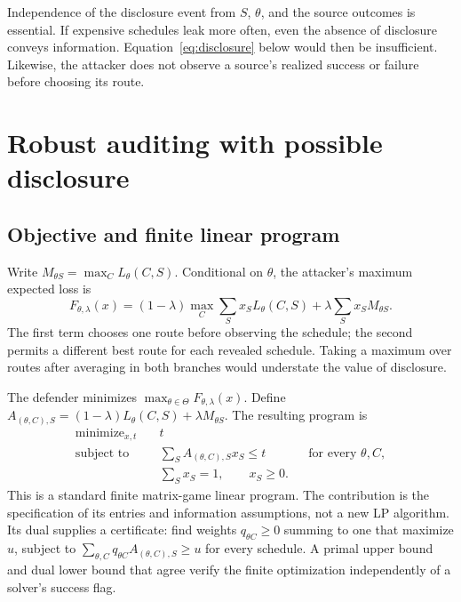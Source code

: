 \documentclass[11pt,letterpaper]{article}
\begin{document}
Independence of the disclosure event from $S$, $\theta$, and the source outcomes is essential. If expensive schedules leak more often, even the absence of disclosure conveys information. Equation~\ref{eq:disclosure} below would then be insufficient. Likewise, the attacker does not observe a source's realized success or failure before choosing its route.

\section{Robust auditing with possible disclosure}

\subsection{Objective and finite linear program}

Write $M_{\theta S}=\max_C L_\theta(C,S)$. Conditional on $\theta$, the attacker's maximum expected loss is
\begin{equation}
F_{\theta,\lambda}(x)=(1-\lambda)\max_C\sum_Sx_SL_\theta(C,S)
+\lambda\sum_Sx_SM_{\theta S}.
\label{eq:disclosure}
\end{equation}
The first term chooses one route before observing the schedule; the second permits a different best route for each revealed schedule. Taking a maximum over routes after averaging in both branches would understate the value of disclosure.

The defender minimizes $\max_{\theta\in\Theta}F_{\theta,\lambda}(x)$. Define
$A_{(\theta,C),S}=(1-\lambda)L_\theta(C,S)+\lambda M_{\theta S}$.
The resulting program is
\begin{equation}
\begin{aligned}
\text{minimize}_{x,t}\quad &t\\
\text{subject to}\quad &\sum_S A_{(\theta,C),S}x_S\leq t
&&\text{for every }\theta,C,\\
&\sum_Sx_S=1,\qquad x_S\geq0.
\end{aligned}
\label{eq:robustlp}
\end{equation}
This is a standard finite matrix-game linear program. The contribution is the specification of its entries and information assumptions, not a new LP algorithm. Its dual supplies a certificate: find weights $q_{\theta C}\geq0$ summing to one that maximize $u$, subject to $\sum_{\theta,C}q_{\theta C}A_{(\theta,C),S}\geq u$ for every schedule. A primal upper bound and dual lower bound that agree verify the finite optimization independently of a solver's success flag.
\end{document}

